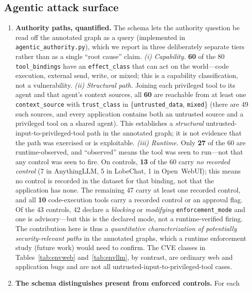 \documentclass[11pt,a4paper]{article}
\newcommand{\cd}[1]{\lstinline[basicstyle=\ttfamily\small]|#1|}
\begin{document}
\subsection{Agentic attack surface}
\begin{enumerate}[leftmargin=1.6em,itemsep=3pt]
\item \textbf{Authority paths, quantified.} The schema lets the authority question be read
      off the annotated graph as a query (implemented in \cd{agentic_authority.py}), which we
      report in three deliberately separate tiers rather than as a single ``root cause''
      claim. \emph{(i) Capability.} \textbf{60} of the 80 \cd{tool_bindings} have an
      \cd{effect_class} that can act on the world---code execution, external send, write, or
      mixed; this is a capability classification, not a vulnerability. \emph{(ii) Structural
      path.} Joining each privileged tool to its agent and that agent's context sources, all
      \textbf{60} are reachable from at least one \cd{context_source} with
      \cd{trust_class} in \{\cd{untrusted_data}, \cd{mixed}\} (there are 49 such sources, and
      every application contains both an untrusted source and a privileged tool on a shared
      agent). This establishes a \emph{structural} untrusted-input-to-privileged-tool path in
      the annotated graph; it is not evidence that the path was exercised or is exploitable.
      \emph{(iii) Runtime.} Only \textbf{27} of the 60 are runtime-observed, and ``observed''
      means the tool was seen to run---not that any control was seen to fire. On controls,
      \textbf{13} of the 60 carry \emph{no recorded control} (7 in AnythingLLM, 5 in LobeChat,
      1 in Open~WebUI); this means no control is recorded in the dataset for that binding, not
      that the application has none. The remaining 47 carry at least one recorded control, and
      all \textbf{10} code-execution tools carry a recorded control or an approval flag. Of the
      43 controls, 42 declare a \emph{blocking} or \emph{modifying} \cd{enforcement_mode} and
      one is advisory---but this is the declared mode, not a runtime-verified firing. The
      contribution here is thus a \emph{quantitative characterization of potentially
      security-relevant paths} in the annotated graphs, which a runtime enforcement study
      (future work) would need to confirm. The CVE classes in Tables~\ref{tab:envweb}
      and~\ref{tab:envllm}, by contrast, are ordinary web and application bugs and are not all
      untrusted-input-to-privileged-tool cases.
\item \textbf{The schema distinguishes present from enforced controls.} For each

\end{enumerate}
\end{document}
